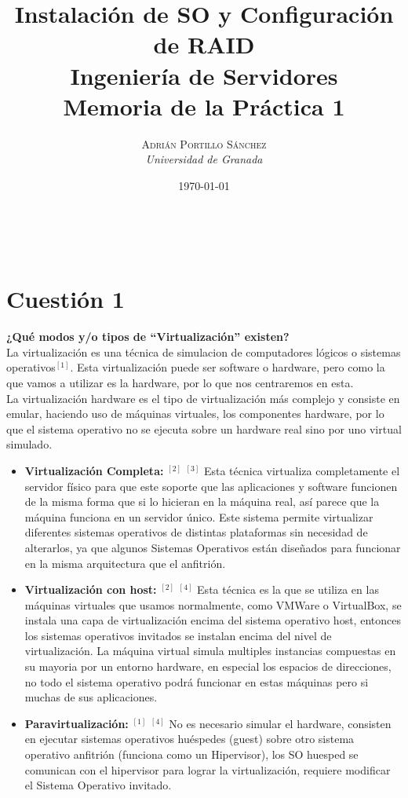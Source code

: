 \documentclass[a4paper, 11pt]{article} %
\title{\textbf{Instalación de SO y Configuración de RAID}\\ %
\vspace{20 pt}
Ingeniería de Servidores \\Memoria de la Práctica 1} %
\author{\textsc{Adrián Portillo Sánchez} %
\\{\textit{Universidad de Granada}}} %
\date{\today} %
\makeatletter
\renewcommand{\maketitle}{ %
\begin{center} %
{\Huge\@title} %
\end{center}

\vspace{20pt} %

\begin{flushright} %
{\large\@author} %
\\\@date %

\vspace{40pt} %
\end{flushright}
}
\makeatother
\begin{document}
\maketitle
\pagebreak
\tableofcontents
\listoffigures
\pagebreak

\section{Cuestión 1}
\textbf{¿Qué modos y/o tipos de “Virtualización” existen?}\\ 
La virtualización es una técnica de simulacion de computadores lógicos o sistemas operativos$^{[1]}$. Esta virtualización puede ser software o hardware, pero como la que vamos a utilizar es la hardware, por lo que nos centraremos en esta. \\La virtualización hardware es el tipo de virtualización más complejo y consiste en emular, haciendo uso de máquinas virtuales, los componentes hardware, por lo que el sistema operativo no se ejecuta sobre un hardware real sino por uno virtual simulado.
\begin{itemize}
\item\textbf{Virtualización Completa:} $^{[2]}$ $^{[3]}$ Esta técnica virtualiza completamente el servidor físico para que este soporte que las aplicaciones y software funcionen de la misma forma que si lo hicieran en la máquina real, así parece que la máquina funciona en un servidor único. Este sistema permite virtualizar diferentes sistemas operativos de distintas plataformas sin necesidad de alterarlos, ya que algunos Sistemas Operativos están diseñados para funcionar en la misma arquitectura que el anfitrión.
\item\textbf{Virtualización con host:} $^{[2]}$ $^{[4]}$ Esta técnica es la que se utiliza en las máquinas virtuales que usamos normalmente, como VMWare o VirtualBox, se instala una capa de virtualización encima del sistema operativo host, entonces los sistemas operativos invitados se instalan encima del nivel de virtualización. La máquina virtual simula multiples instancias compuestas en su mayoria por un entorno hardware, en especial los espacios de direcciones, no todo el sistema operativo podrá funcionar en estas máquinas pero si muchas de sus aplicaciones.  
\item\textbf{Paravirtualización:} $^{[1]}$ $^{[4]}$ No es necesario simular el hardware, consisten en ejecutar sistemas operativos huéspedes (guest) sobre otro sistema operativo anfitrión (funciona como un Hipervisor), los SO huesped se comunican con el hipervisor para lograr la virtualización, requiere modificar el Sistema Operativo invitado.
\end{itemize}
\end{document}
